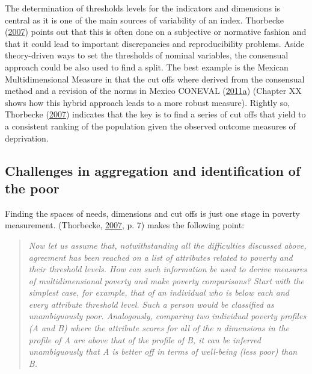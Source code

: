 \documentclass[]{book}
\begin{document}
The determination of thresholds levels for the indicators and dimensions is central as it is one of the main sources of variability of an index. Thorbecke (\protect\hyperlink{ref-Thorbecke2007}{2007}) points out that this is often done on a subjective or normative fashion and that it could lead to important discrepancies and reproducibility problems. Aside theory-driven ways to set the thresholds of nominal variables, the consensual approach could be also used to find a split. The best example is the Mexican Multidimensional Measure in that the cut offs where derived from the consensual method and a revision of the norms in Mexico CONEVAL (\protect\hyperlink{ref-CONEVAL2011a}{2011}\protect\hyperlink{ref-CONEVAL2011a}{a}) (Chapter XX shows how this hybrid approach leads to a more robust measure). Rightly so, Thorbecke (\protect\hyperlink{ref-Thorbecke2007}{2007}) indicates that the key is to find a series of cut offs that yield to a consistent ranking of the population given the observed outcome measures of deprivation.

\hypertarget{challenges-in-aggregation-and-identification-of-the-poor}{%
\subsection{Challenges in aggregation and identification of the poor}\label{challenges-in-aggregation-and-identification-of-the-poor}}

Finding the spaces of needs, dimensions and cut offs is just one stage in poverty measurement. (Thorbecke, \protect\hyperlink{ref-Thorbecke2007}{2007}, p. 7) makes the following point:

\begin{quote}
\emph{Now let us assume that, notwithstanding all the difficulties discussed above, agreement has been reached on a list of attributes related to poverty and their threshold levels. How can such information be used to derive measures of multidimensional poverty and make poverty comparisons? Start with the simplest case, for example, that of an individual who is below each and every attribute threshold level. Such a person would be classified as unambiguously poor. Analogously, comparing two individual poverty profiles (A and B) where the attribute scores for all of the n dimensions in the profile of A are above that of the profile of B, it can be inferred unambiguously that A is better off in terms of well-being (less poor) than B.}
\end{quote}
\end{document}
